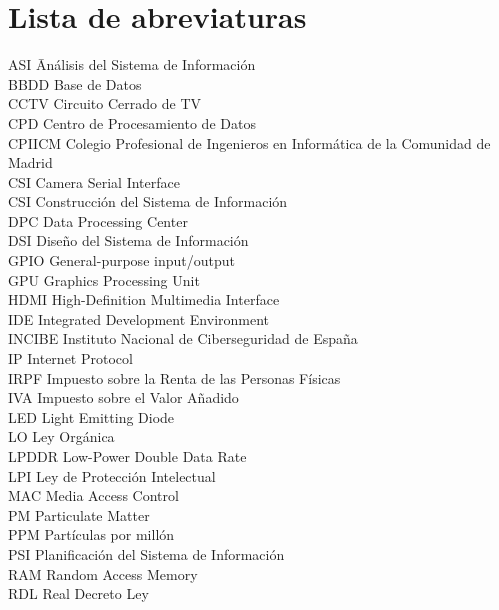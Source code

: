 \newpage %
\thispagestyle{empty}
\mbox{}

\chapter*{Lista de abreviaturas}
\begin{tabbing} %
	ASI \quad\quad\quad\= Análisis del Sistema de Información \\
	BBDD \> Base de Datos \\
	CCTV \> Circuito Cerrado de TV \\
	CPD \> Centro de Procesamiento de Datos \\
	CPIICM \> Colegio Profesional de Ingenieros en Informática de la Comunidad de Madrid \\
	CSI \> Camera Serial Interface \\
	CSI \> Construcción del Sistema de Información \\
	DPC \> Data Processing Center \\
	DSI \> Diseño del Sistema de Información \\
	GPIO \> General-purpose input/output \\
	GPU \> Graphics Processing Unit \\
	HDMI \> High-Definition Multimedia Interface \\
	IDE \> Integrated Development Environment \\
	INCIBE \> Instituto Nacional de Ciberseguridad de España \\
	IP \> Internet Protocol \\
	IRPF \> Impuesto sobre la Renta de las Personas Físicas \\
	IVA \> Impuesto sobre el Valor Añadido \\
	LED \> Light Emitting Diode \\
	LO \> Ley Orgánica \\
	LPDDR \> Low-Power Double Data Rate \\
	LPI \> Ley de Protección Intelectual \\
	MAC \> Media Access Control \\
	PM \> Particulate Matter \\
	PPM \> Partículas por millón \\
	PSI \> Planificación del Sistema de Información \\
	RAM \> Random Access Memory \\
	RDL \> Real Decreto Ley \\

\end{tabbing}
